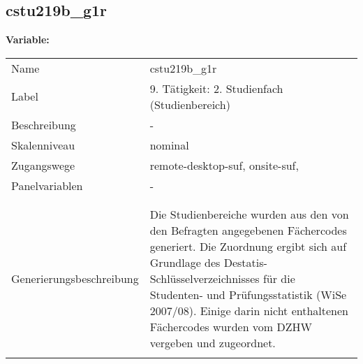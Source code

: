 	
	
	\subsection{cstu219b\_g1r}
	\label{subSection:cstu219b_g1r}

	\noindent\textbf{Variable:}\\
		\begin{tabular}{lL{11.3cm}}
			\label{tableVariable:cstu219b_g1r}
			Name & cstu219b\_g1r \\
			Label & 9. Tätigkeit: 2. Studienfach (Studienbereich) \\
			Beschreibung & - \\
			Skalenniveau & nominal \\
			Zugangswege &
				remote-desktop-suf,
				onsite-suf,
 \\
			Panelvariablen & -
			 \\
			 \\
 \\
					Generierungsbeschreibung & Die Studienbereiche wurden aus den von den Befragten angegebenen Fächercodes generiert. Die Zuordnung ergibt sich auf Grundlage des Destatis-Schlüsselverzeichnisses für die Studenten- und Prüfungsstatistik (WiSe 2007/08). Einige darin nicht enthaltenen Fächercodes wurden vom DZHW vergeben und zugeordnet. 
				 \\	
			 \\
		\end{tabular}






